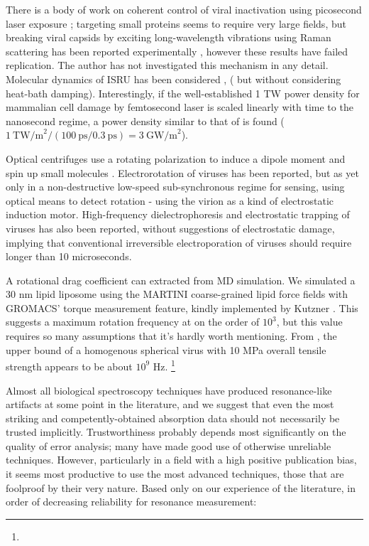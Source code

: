 \documentclass[paper.tex]{subfiles}
\begin{document}
\begin{multicols}{1}
There is a body of work on coherent control of viral inactivation using picosecond laser exposure \cite{Maximum2010}; targeting small proteins seems to require very large fields\cite{Picosecond2016b}, but breaking viral capsids by exciting long-wavelength vibrations using Raman scattering has been reported experimentally \cite{Inactivation2007}\cite{Prospects2012}\cite{Studies2014}, however these results have failed replication\cite{No2011}. The author has not investigated this mechanism in any detail. Molecular dynamics of ISRU has been considered \cite{Maximum2010}, (\cite{Vibrational2009} but without considering heat-bath damping). Interestingly, if the well-established 1 TW power density\cite{Targeted2002} for mammalian cell damage by femtosecond laser is scaled linearly with time to the nanosecond regime, a power density similar to that of \cite{Repeated2020} is found ($1\ \text{TW/m}^2 / (100\ \text{ps} / 0.3\ \text{ps}) = 3\ \text{GW/m}^2$). 

Optical centrifuges use a rotating polarization to induce a dipole moment and spin up small molecules \cite{Forced2000}\cite{Spinning2000}. Electrorotation\cite{RotatingFieldInduced1982}\cite{Electrorotation1988}\cite{Electrorotation1997}\cite{Dielectric1988} of viruses has been reported\cite{Analysis2004}\cite{New1999}\cite{comprehensive2001}, but as yet only in a non-destructive low-speed sub-synchronous regime for sensing, using optical means to detect rotation - using the virion as a kind of electrostatic induction motor. High-frequency dielectrophoresis and electrostatic trapping of viruses has also been reported\cite{Accumulation2006}, without suggestions of electrostatic damage, implying that conventional irreversible electroporation of viruses should require longer than 10 microseconds.

A rotational drag coefficient can extracted from MD simulation\cite{Evaluating2017}. We simulated a 30 nm lipid liposome using the MARTINI coarse-grained \cite{MARTINI2007} lipid force fields with GROMACS\cite{GROMACS2005}' torque measurement feature, kindly implemented by Kutzner \cite{Keep2011}. This suggests a maximum rotation frequency at on the order of $10^3$, but this value requires so many assumptions that it's hardly worth mentioning. From \cite{Spinning2008}, the upper bound of a homogenous spherical virus with 10 MPa overall tensile strength appears to be about $10^9$ Hz. \footnote{}



Almost all biological spectroscopy techniques have produced resonance-like artifacts at some point in the literature, and we suggest that even the most striking and competently-obtained absorption data should not necessarily be trusted implicitly. Trustworthiness probably depends most significantly on the quality of error analysis; many have made good use of otherwise unreliable techniques. However, particularly in a field with a high positive publication bias, it seems most productive to use the most advanced techniques, those that are foolproof by their very nature. Based only on our experience of the literature, in order of decreasing reliability for resonance measurement:


\end{multicols}
\end{document}

